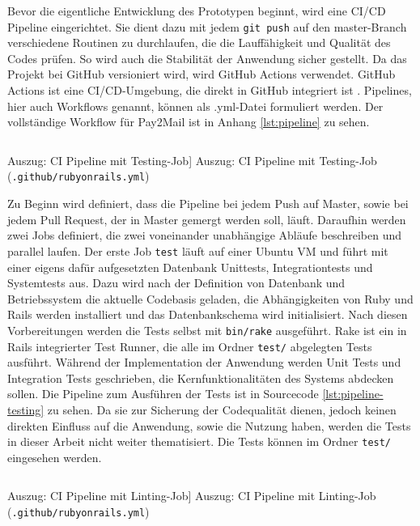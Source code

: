 Bevor die eigentliche Entwicklung des Prototypen beginnt, wird eine CI/CD Pipeline eingerichtet. Sie dient dazu mit jedem \texttt{git push} auf den master-Branch verschiedene Routinen zu durchlaufen, die die Lauffähigkeit und Qualität des Codes prüfen. So wird auch die Stabilität der Anwendung sicher gestellt. Da das Projekt bei GitHub versioniert wird, wird GitHub Actions verwendet. GitHub Actions ist eine CI/CD-Umgebung, die direkt in GitHub integriert ist \citep{GitHub2022}. Pipelines, hier auch Workflows genannt, können als .yml-Datei formuliert werden. Der vollständige Workflow für Pay2Mail ist in Anhang \ref{lst:pipeline} zu sehen.

\begin{listing}[!ht]
\inputminted[firstline=8, lastline=18, linenos]{yaml}{Listings/Prototype/rubyonrails.yml}

\caption
    [Auszug: CI Pipeline mit Testing-Job]
    {Auszug: CI Pipeline mit Testing-Job (\texttt{.github/rubyonrails.yml})}

\label{lst:pipeline-testing}
\end{listing}

Zu Beginn wird definiert, dass die Pipeline bei jedem Push auf Master, sowie bei jedem Pull Request, der in Master gemergt werden soll, läuft. Daraufhin werden zwei Jobs definiert, die zwei voneinander unabhängige Abläufe beschreiben und parallel laufen. Der erste Job \texttt{test} läuft auf einer Ubuntu VM und führt mit einer eigens dafür aufgesetzten Datenbank Unittests, Integrationtests und Systemtests aus. Dazu wird nach der Definition von Datenbank und Betriebssystem die aktuelle Codebasis geladen, die Abhängigkeiten von Ruby und Rails werden installiert und das Datenbankschema wird initialisiert. Nach diesen Vorbereitungen werden die Tests selbst mit \texttt{bin/rake} ausgeführt. Rake ist ein in Rails integrierter Test Runner, die alle im Ordner \texttt{test/} abgelegten Tests ausführt. Während der Implementation der Anwendung werden Unit Tests und Integration Tests geschrieben, die Kernfunktionalitäten des Systems abdecken sollen. Die Pipeline zum Ausführen der Tests ist in Sourcecode \ref{lst:pipeline-testing} zu sehen. Da sie zur Sicherung der Codequalität dienen, jedoch keinen direkten Einfluss auf die Anwendung, sowie die Nutzung haben, werden die Tests in dieser Arbeit nicht weiter thematisiert. Die Tests können im Ordner \texttt{test/} eingesehen werden.

\begin{listing}[!ht]
\inputminted[firstline=19, lastline=31, linenos]{yaml}{Listings/Prototype/rubyonrails.yml}

\caption
    [Auszug: CI Pipeline mit Linting-Job]
    {Auszug: CI Pipeline mit Linting-Job (\texttt{.github/rubyonrails.yml})}
    
\label{lst:pipeline-linting}
\end{listing}


